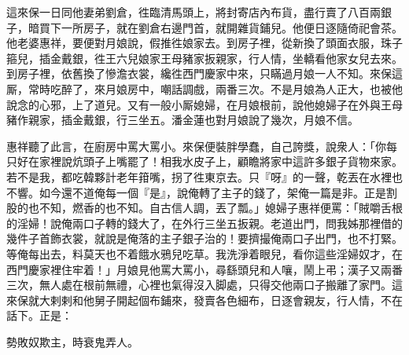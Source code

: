 這來保一日同他妻弟劉倉，徃臨清馬頭上，將封寄店內布貨，盡行賣了八百兩銀子，暗買下一所房子，就在劉倉右邊門首，就開雜貨鋪兒。他便日逐隨倚祀會茶。他老婆惠祥，要便對月娘說，假推徃娘家去。到房子裡，從新換了頭面衣服，珠子箍兒，插金戴銀，徃王六兒娘家王母豬家扳親家，行人情，坐轎看他家女兒去來。到房子裡，依舊換了慘澹衣裳，纔徃西門慶家中來，只瞞過月娘一人不知。來保這厮，常時吃醉了，來月娘房中，嘲話調戲，兩番三次。不是月娘為人正大，也被他說念的心邪，上了道兒。又有一般小厮媳婦，在月娘根前，說他媳婦子在外與王母豬作親家，插金戴銀，行三坐五。潘金蓮也對月娘說了幾次，月娘不信。

惠祥聽了此言，在廚房中罵大罵小。來保便裝胖學蠢，自己誇獎，說衆人：「你每只好在家裡說炕頭子上嘴罷了！相我水皮子上，顧瞻將家中這許多銀子貨物來家。若不是我，都吃韓夥計老年箝嘴，拐了徃東京去。{}只『呀』的一聲，乾丟在水裡也不響。如今還不道俺每一個『是』，說俺轉了主子的錢了，架俺一篇是非。正是割股的也不知，燃香的也不知。自古信人調，丟了瓢。」媳婦子惠祥便罵：「賊嚼舌根的淫婦！說俺兩口子轉的錢大了，在外行三坐五扳親。老道出門，問我姊那裡借的幾件子首飾衣裳，就說是俺落的主子銀子治的！要擠撮俺兩口子出門，也不打緊。{}等俺每出去，料莫天也不着餓水鴉兒吃草。我洗淨着眼兒，看你這些淫婦奴才，在西門慶家裡住牢着！」月娘見他罵大罵小，尋繇頭兒和人嚷，鬧上弔；漢子又兩番三次，無人處在根前無禮，心裡也氣得沒入脚處，只得交他兩口子搬離了家門。這來保就大剌剌和他舅子開起個布鋪來，發賣各色細布，日逐會親友，行人情，不在話下。正是：

\begin{myquote}
勢敗奴欺主，時衰鬼弄人。
\end{myquote}

